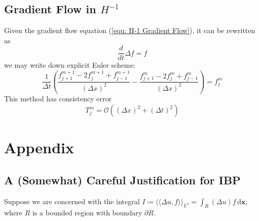 \documentclass[a4paper]{article}
\newcommand{\llangle}{\langle \langle}
\newcommand{\rrangle}{\rangle \rangle}
\newcommand{\dxx}{\, \text{d} \mathbf{x}}
\theoremstyle{definition}
\begin{document}
\subsection{Gradient Flow in $H^{-1}$}
Given the gradient flow equation (\ref{equ: H-1 Gradient Flow}), it can be rewritten as
\begin{equation}
    \frac{d}{dt} \Delta f = f
\end{equation}
we may write down explicit Euler scheme:
\begin{equation}
    \frac{1}{\Delta t}\left( \frac{f_{j+1}^{m+1} - 2f_j^{m+1} + f_{j-1}^{m+1}}{\left( \Delta x \right)^2} - \frac{f_{j+1}^{m} - 2f_j^{m} + f_{j-1}^{m}}{\left( \Delta x \right)^2} \right) = f_j^m
    \label{equ: H-1 Numeric}
\end{equation}
This method has consistency error
\begin{equation}
    T_j^m = \mathcal{O}\left( \left( \Delta x \right)^2 + (\Delta t)^2 \right)
    \label{H1 Consistency Error}
\end{equation}


\newpage
\section{Appendix}
\subsection{A (Somewhat) Careful Justification for IBP}
\label{sct: IBP Justification}
Suppose we are concerned with the integral $I \coloneqq \llangle \Delta u, f \rrangle_{L^2} = \int_{R} (\Delta u)f \dxx$, where $R$ is a bounded region with boundary $\partial R$.
\end{document}
